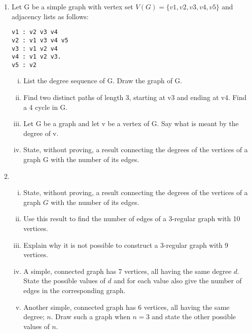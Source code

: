 \documentclass[]{article}
\begin{document}
\begin{enumerate}
\item 
Let G be a simple graph with vertex set $V(G) = \{v1, v2, v3, v4, v5\}$ and adjacency lists as follows:
\begin{verbatim}
v1 : v2 v3 v4
v2 : v1 v3 v4 v5
v3 : v1 v2 v4
v4 : v1 v2 v3.
v5 : v2
\end{verbatim}
\begin{enumerate}[(i)]
\item List the degree sequence of G. Draw the graph of G.
\item Find two distinct paths of length 3, starting at v3 and ending at v4. Find a 4 cycle in G.
\item Let G be a graph and let v be a vertex of G. Say what is meant by the degree of v.
\item State, without proving, a result connecting the degrees of the vertices of a graph G with the number of its edges.

\end{enumerate}
\item
\begin{enumerate}[(i)]

\item State, without proving, a result connecting the degrees of the vertices of 
a graph $G$ with the number of its edges. 
\item Use this result to find the number of edges of a 3-regular graph with 10 
vertices. 

\item Explain why it is not possible to construct a 3-regular graph with 9 vertices. 

\item A simple, connected graph has 7 vertices, all having the same degree $d$. State the possible values of $d$ and for each value also give the number of edges in the corresponding graph.
\item 
Another simple, connected graph has 6 vertices, all having the same degree; $n$. Draw such a graph when $n = 3$ and state the other possible values of $n$. 
\end{enumerate}
\end{enumerate}
\end{document}
